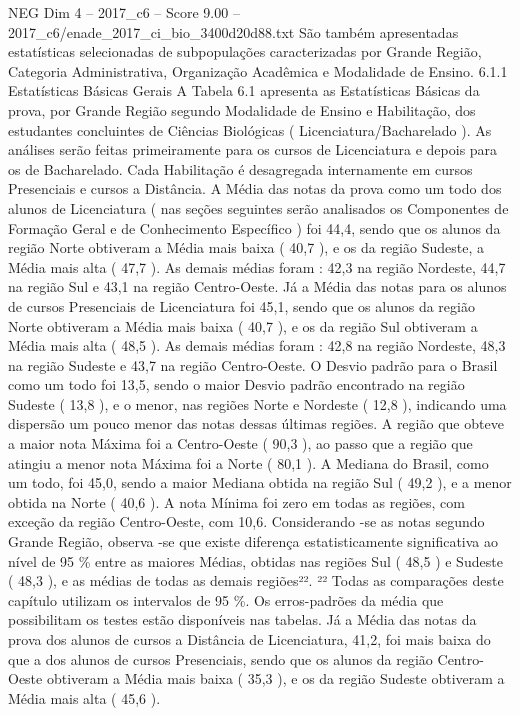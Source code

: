 \begin{textsample}{NEG Dim 4 – 2017\_c6 – Score 9.00 – 2017\_c6/enade\_2017\_ci\_bio\_3400d20d88.txt}
São também apresentadas estatísticas selecionadas de subpopulações caracterizadas por Grande Região, Categoria Administrativa, Organização Acadêmica e Modalidade de Ensino. 6.1.1 Estatísticas Básicas Gerais A Tabela 6.1 apresenta as Estatísticas Básicas da prova, por Grande Região segundo Modalidade de Ensino e Habilitação, dos estudantes concluintes de Ciências Biológicas ( Licenciatura/Bacharelado ).
As análises serão feitas primeiramente para os cursos de Licenciatura e depois para os de Bacharelado.
Cada Habilitação é desagregada internamente em cursos Presenciais e cursos a Distância.
A Média das notas da prova como um todo dos alunos de Licenciatura ( nas seções seguintes serão analisados os Componentes de Formação Geral e de Conhecimento Específico ) foi 44,4, sendo que os alunos da região Norte obtiveram a Média mais baixa ( 40,7 ), e os da região Sudeste, a Média mais alta ( 47,7 ).
As demais médias foram : 42,3 na região Nordeste, 44,7 na região Sul e 43,1 na região Centro-Oeste.
Já a Média das notas para os alunos de cursos Presenciais de Licenciatura foi 45,1, sendo que os alunos da região Norte obtiveram a Média mais baixa ( 40,7 ), e os da região Sul obtiveram a Média mais alta ( 48,5 ).
As demais médias foram : 42,8 na região Nordeste, 48,3 na região Sudeste e 43,7 na região Centro-Oeste.
O Desvio padrão para o Brasil como um todo foi 13,5, sendo o maior Desvio padrão encontrado na região Sudeste ( 13,8 ), e o menor, nas regiões Norte e Nordeste ( 12,8 ), indicando uma dispersão um pouco menor das notas dessas últimas regiões.
A região que obteve a maior nota Máxima foi a Centro-Oeste ( 90,3 ), ao passo que a região que atingiu a menor nota Máxima foi a Norte ( 80,1 ).
A Mediana do Brasil, como um todo, foi 45,0, sendo a maior Mediana obtida na região Sul ( 49,2 ), e a menor obtida na Norte ( 40,6 ).
A nota Mínima foi zero em todas as regiões, com exceção da região Centro-Oeste, com 10,6.
Considerando -se as notas segundo Grande Região, observa -se que existe diferença estatisticamente significativa ao nível de 95 \% entre as maiores Médias, obtidas nas regiões Sul ( 48,5 ) e Sudeste ( 48,3 ), e as médias de todas as demais regiões²². ²² Todas as comparações deste capítulo utilizam os intervalos de 95 \%.
Os erros-padrões da média que possibilitam os testes estão disponíveis nas tabelas.
Já a Média das notas da prova dos alunos de cursos a Distância de Licenciatura, 41,2, foi mais baixa do que a dos alunos de cursos Presenciais, sendo que os alunos da região Centro-Oeste obtiveram a Média mais baixa ( 35,3 ), e os da região Sudeste obtiveram a Média mais alta ( 45,6 ).

\end{textsample}
